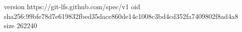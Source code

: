version https://git-lfs.github.com/spec/v1
oid sha256:99bfe78d7e619832fbed35dace860de14c1008c3bd4cd352fa7409802f8ad4a8
size 262240
